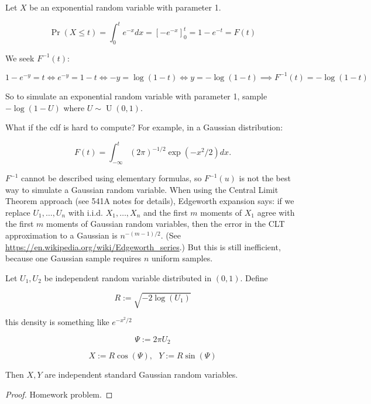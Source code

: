 \begin{example} Let \(X\) be an exponential random variable with parameter 1.

\[
\Pr(X \leq t) = \int_0^t e^{-x} dx = [- e^{-x}]_0^t = 1 - e^{-t} = F(t)
\]

We seek \(F^{-1}(t)\): 

\[
1 - e^{-y} = t \iff e^{-y} = 1 - t \iff -y = \log(1-t) \iff y = -\log(1-t) \implies F^{-1}(t) = -\log(1-t)
\]

So to simulate an exponential random variable with parameter 1, sample \(-\log(1-U)\) where \(U \sim \operatorname{U}(0,1)\).

\end{example}

\begin{remark} What if the cdf is hard to compute? For example, in a Gaussian distribution: 

\[
F(t) = \int_{-\infty}^t (2 \pi)^{-1/2} \exp(-x^2/2)  dx.
\]

\(F^{-1}\) cannot be described using elementary formulas, so \(F^{-1}(u)\) is not the best way to simulate a Gaussian random variable. When using the Central Limit Theorem approach (see 541A notes for details), Edgeworth expansion says: if we replace \(U_1, \ldots, U_n\) with i.i.d. \(X_1, \ldots, X_n\) and the first \(m\) moments of \(X_1\) agree with the first \(m\) moments of Gaussian random variables, then the error in the CLT approximation to a Gaussian is \(n^{-(m-1)/2}\). (See \url{https://en.wikipedia.org/wiki/Edgeworth_series}.) But this is still inefficient, because one Gaussian sample requires \(n\) uniform samples.

\end{remark}

\begin{proposition} Let \(U_1, U_2\) be independent random variable distributed in \((0,1)\). Define

\[
R:= \sqrt{-2 \log(U_1)}
\]

\^ this density is something like \(e^{-x^2/2}\)

\[
\Psi := 2 \pi U_2
\]

\[
X := R \cos(\Psi), \ \ \ Y:= R \sin(\Psi)
\]

Then \(X, Y\) are independent standard Gaussian random variables. 
\end{proposition}

\begin{proof} Homework problem.

\end{proof}

